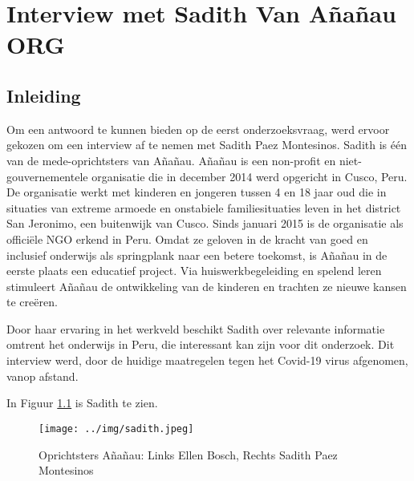 
\chapter{Interview met Sadith Van Añañau ORG}
\label{ch:interviewSadith}

\section{Inleiding}
Om een antwoord te kunnen bieden op de eerst onderzoeksvraag, werd ervoor gekozen om een interview af te nemen met Sadith Paez Montesinos. Sadith is één van de mede-oprichtsters van Añañau. Añañau is een non-profit en niet-gouvernementele organisatie die in december 2014 werd opgericht in Cusco, Peru. De organisatie werkt met kinderen en jongeren tussen 4 en 18 jaar oud die in situaties van extreme armoede en onstabiele familiesituaties leven in het district San Jeronimo, een buitenwijk van Cusco. Sinds januari 2015 is de organisatie als officiële NGO erkend in Peru. Omdat ze geloven in de kracht van goed en inclusief onderwijs als springplank naar een betere toekomst, is Añañau in de eerste plaats een educatief project. Via huiswerkbegeleiding en spelend leren stimuleert Añañau de ontwikkeling van de kinderen en trachten ze nieuwe kansen te creëren. \autocite{Ananau2020}

Door haar ervaring in het werkveld beschikt Sadith over relevante informatie omtrent het onderwijs in Peru, die interessant kan zijn voor dit onderzoek. Dit interview werd, door de huidige maatregelen tegen het Covid-19 virus afgenomen, vanop afstand.

In Figuur \ref{sadith} is Sadith te zien.

 \begin{figure}[h!]
	\texttt{[image: ../img/sadith.jpeg]}
	\caption{Oprichtsters Añañau: Links Ellen Bosch, Rechts Sadith Paez Montesinos} \autocite{Ananau2020}
	\label{sadith}
\end{figure}


